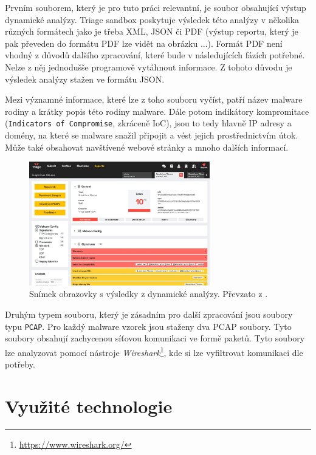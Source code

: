 Prvním souborem, který je pro tuto práci relevantní, je soubor obsahující výstup dynamické analýzy. Triage sandbox poskytuje výsledek této analýzy v několika různých formátech jako je třeba XML, JSON či PDF (výstup reportu, který je pak převeden do formátu PDF lze vidět na obrázku ...).
Formát PDF není vhodný z důvodů dalšího zpracování, které bude v následujících fázích potřebné. Nelze z něj jednodušše programově vytáhnout informace. Z tohoto důvodu je výsledek analýzy stažen ve formátu JSON.

Mezi významné informace, které lze z toho souboru vyčíst, patří název malware rodiny a krátky popis této rodiny malware. Dále potom indikátory kompromitace (\texttt{Indicators of Compromise}, zkráceně IoC), 
jsou to tedy hlavně IP adresy a domény, na které se malware snažil připojit a vést jejich prostřednictvím útok. Může také obsahovat navštívené webové stránky a mnoho dalších informací.

\begin{figure}[h]
	\centering
        \includegraphics[width=0.7\textwidth]{obrazky/3-triage-report.png}
	\caption{Snímek obrazovky s výsledky z dynamické analýzy. Převzato z \cite{hatching}.}
    \label{Report_image}
\end{figure}

Druhým typem souboru, který je zásadním pro další zpracování jsou soubory typu \texttt{PCAP}. Pro každý malware vzorek jsou staženy dva PCAP soubory.
Tyto soubory obsahují zachycenou síťovou komunikaci ve formě paketů. Tyto soubory lze analyzovat pomocí nástroje \textit{Wireshark}\footnote{\href{https://www.wireshark.org/}{https://www.wireshark.org/}}, 
kde si lze vyfiltrovat komunikaci dle potřeby.

\newpage
\section{Využité technologie}

